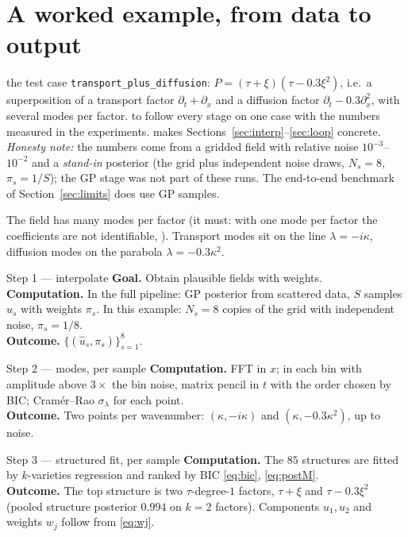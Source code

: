 \section{A worked example, from data to output}\label{sec:example}
\sectionbrief
{the test case \texttt{transport\_plus\_diffusion}: $P=(\tau+\xi)(\tau-0.3\xi^2)$, i.e.\ a superposition of a transport factor $\partial_t+\partial_x$ and a diffusion factor $\partial_t-0.3\partial_x^2$, with several modes per factor.}
{to follow every stage on one case with the numbers measured in the experiments.}
{makes Sections~\ref{sec:interp}--\ref{sec:loop} concrete. \emph{Honesty note:} the numbers come from a gridded field with relative noise $10^{-3}$--$10^{-2}$ and a \emph{stand-in} posterior (the grid plus independent noise draws, $N_s=8$, $\pi_s=1/S$); the GP stage was not part of these runs. The end-to-end benchmark of Section~\ref{sec:limits} does use GP samples.}

The field has many modes per factor (it must: with one mode per factor the coefficients are not identifiable, ). Transport modes sit on the line $\lambda=-i\kappa$, diffusion modes on the parabola $\lambda=-0.3\kappa^2$.

\begin{wstep}{Step 1 --- interpolate}
\textbf{Goal.} Obtain plausible fields with weights.\\
\textbf{Computation.} In the full pipeline: GP posterior from scattered data, $S$ samples $\hat u_s$ with weights $\pi_s$. In this example: $N_s=8$ copies of the grid with independent noise, $\pi_s=1/8$.\\
\textbf{Outcome.} $\{(\hat u_s,\pi_s)\}_{s=1}^8$.
\end{wstep}

\begin{wstep}{Step 2 --- modes, per sample}
\textbf{Computation.} FFT in $x$; in each bin with amplitude above $3\times$ the bin noise, matrix pencil in $t$ with the order chosen by BIC; Cram\'er--Rao $\sigma_\lambda$ for each point.\\
\textbf{Outcome.} Two points per wavenumber: $(\kappa,-i\kappa)$ and $(\kappa,-0.3\kappa^2)$, up to noise.
\end{wstep}

\begin{wstep}{Step 3 --- structured fit, per sample}
\textbf{Computation.} The $85$ structures are fitted by $k$-varieties regression and ranked by BIC \eqref{eq:bic}, \eqref{eq:postM}.\\
\textbf{Outcome.} The top structure is two $\tau$-degree-$1$ factors, $\tau+\xi$ and $\tau-0.3\xi^2$ (pooled structure posterior $0.994$ on $k=2$ factors). Components $u_1,u_2$ and weights $w_j$ follow from \eqref{eq:wj}.
\end{wstep}

